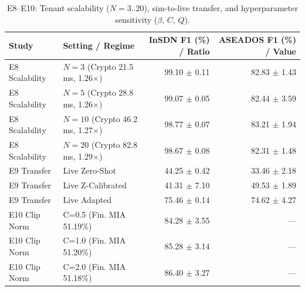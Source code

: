 \begin{table}[t]
\centering
\caption{E8--E10: Tenant scalability ($N=3..20$), sim-to-live transfer, and hyperparameter sensitivity ($\beta$, $C$, $Q$).}
\label{tab:e8_e9_e10}
\begin{tabular}{llrr}
\toprule
Study & Setting / Regime & InSDN F1 (\%) / Ratio & ASEADOS F1 (\%) / Value \\
\midrule
E8 Scalability & $N=3$ (Crypto 21.5 ms, 1.26$\times$) & 99.10 $\pm$ 0.11 & 82.83 $\pm$ 1.43 \\
E8 Scalability & $N=5$ (Crypto 28.8 ms, 1.26$\times$) & 99.07 $\pm$ 0.05 & 82.44 $\pm$ 3.59 \\
E8 Scalability & $N=10$ (Crypto 46.2 ms, 1.27$\times$) & 98.77 $\pm$ 0.07 & 83.21 $\pm$ 1.94 \\
E8 Scalability & $N=20$ (Crypto 82.8 ms, 1.29$\times$) & 98.67 $\pm$ 0.08 & 82.31 $\pm$ 1.48 \\
\midrule
E9 Transfer & Live Zero-Shot & 44.25 $\pm$ 0.42 & 33.46 $\pm$ 2.18 \\
E9 Transfer & Live Z-Calibrated & 41.31 $\pm$ 7.10 & 49.53 $\pm$ 1.89 \\
E9 Transfer & Live Adapted & 75.46 $\pm$ 0.14 & 74.62 $\pm$ 4.27 \\
\midrule
E10 Clip Norm & C=0.5 (Fin. MIA 51.19\%) & 84.28 $\pm$ 3.55 & --- \\
E10 Clip Norm & C=1.0 (Fin. MIA 51.20\%) & 85.28 $\pm$ 3.14 & --- \\
E10 Clip Norm & C=2.0 (Fin. MIA 51.18\%) & 86.40 $\pm$ 3.27 & --- \\
\bottomrule
\end{tabular}
\end{table}
